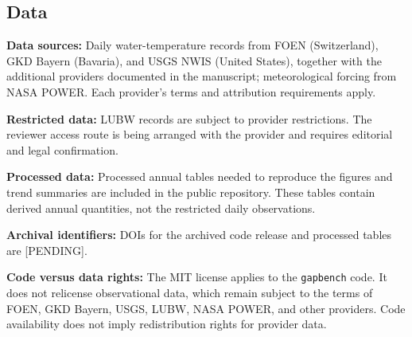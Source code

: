 \subsection*{Data}

\textbf{Data sources:} Daily water-temperature records from FOEN (Switzerland), GKD Bayern (Bavaria), and USGS NWIS (United States), together with the additional providers documented in the manuscript; meteorological forcing from NASA POWER. Each provider's terms and attribution requirements apply.

\textbf{Restricted data:} LUBW records are subject to provider restrictions. The reviewer access route is being arranged with the provider and requires editorial and legal confirmation.


\textbf{Processed data:} Processed annual tables needed to reproduce the figures and trend summaries are included in the public repository. These tables contain derived annual quantities, not the restricted daily observations.

\textbf{Archival identifiers:} DOIs for the archived code release and processed tables are [PENDING].

\textbf{Code versus data rights:} The MIT license applies to the \texttt{gapbench} code. It does not relicense observational data, which remain subject to the terms of FOEN, GKD Bayern, USGS, LUBW, NASA POWER, and other providers. Code availability does not imply redistribution rights for provider data.

